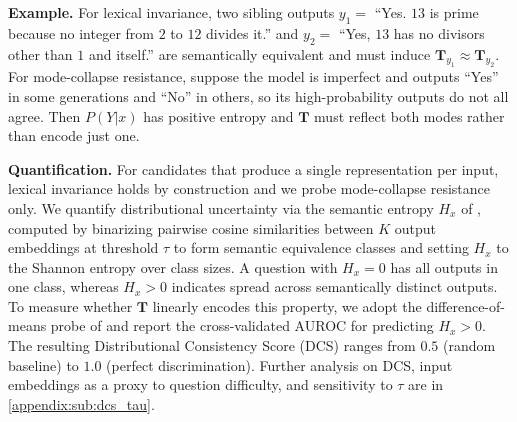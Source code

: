 \textbf{Example.} For lexical invariance, two sibling outputs
$y_1 =$ ``Yes. $13$ is prime because no integer from $2$ to $12$ divides it.''
and $y_2 =$ ``Yes, $13$ has no divisors other than $1$ and itself.'' are
semantically equivalent and must induce $\mathbf{T}_{y_1} \approx \mathbf{T}_{y_2}$.
For mode-collapse resistance, suppose the model is imperfect and outputs
``Yes'' in some generations and ``No'' in others, so its high-probability outputs
do not all agree. Then $P(Y|x)$ has positive entropy and $\mathbf{T}$ must
reflect both modes rather than encode just one.

\textbf{Quantification.} For candidates that produce a single representation per input, lexical invariance holds by construction and we probe mode-collapse resistance only. We quantify distributional uncertainty via the semantic entropy $H_x$ of \citet{kuhn2023semantic}, computed by binarizing pairwise cosine similarities between $K$ output embeddings at threshold $\tau$ to form semantic equivalence classes and setting $H_x$ to the Shannon entropy over class sizes. A question with $H_x = 0$ has all outputs in one class, whereas $H_x > 0$ indicates spread across semantically distinct outputs. To measure whether $\mathbf{T}$ linearly encodes this property, we adopt the difference-of-means probe of \citet{cencerrado2026answerneededpredictingllm} and report the cross-validated AUROC for predicting $H_x > 0$. The resulting Distributional Consistency Score (DCS) ranges from $0.5$ (random baseline) to $1.0$ (perfect discrimination). Further analysis on DCS, input embeddings as a proxy to question difficulty, and sensitivity to $\tau$ are in \cref{appendix:sub:dcs_tau}.

